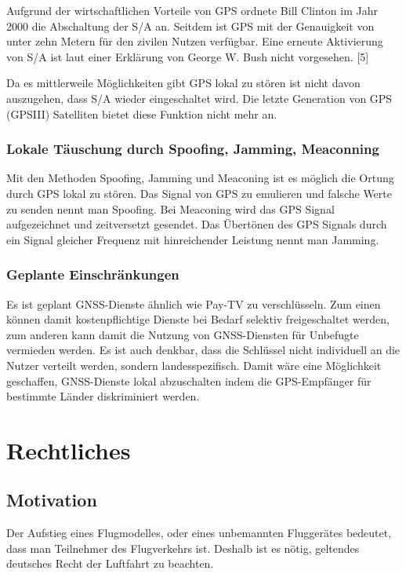 \documentclass[letterpaper,11pt,ngerman]{andi}
\begin{document}
Aufgrund der wirtschaftlichen Vorteile von GPS ordnete Bill Clinton im Jahr 2000 die Abschaltung der S/A an. Seitdem ist GPS mit der Genauigkeit von unter zehn Metern für den zivilen Nutzen verfügbar. Eine erneute Aktivierung von S/A ist laut einer Erklärung von George W. Bush nicht vorgesehen. {[}5{]}

Da es mittlerweile Möglichkeiten gibt GPS lokal zu stören ist nicht davon auszugehen, dass S/A wieder eingeschaltet wird. Die letzte Generation von GPS (GPSIII) Satelliten bietet diese Funktion nicht mehr an. \cite{sat_nav_dodel}


\subsection{Lokale Täuschung durch Spoofing, Jamming, Meaconning}
\label{included_projects/gps/GPS_SPEC/content:lokale-tauschung-durch-spoofing-jamming-meaconning}
Mit den Methoden Spoofing, Jamming und Meaconing ist es möglich die Ortung durch GPS lokal zu stören. Das Signal von GPS zu emulieren und falsche Werte zu senden nennt man Spoofing. Bei Meaconing wird das GPS Signal aufgezeichnet und zeitversetzt gesendet. Das Übertönen des GPS Signals durch ein Signal gleicher Frequenz mit hinreichender Leistung nennt man Jamming.


\subsection{Geplante Einschränkungen}
\label{included_projects/gps/GPS_SPEC/content:geplante-einschrankungen}
Es ist geplant GNSS-Dienste ähnlich wie Pay-TV zu verschlüsseln. Zum einen können damit kostenpflichtige Dienste bei Bedarf selektiv freigeschaltet werden, zum anderen kann damit die Nutzung von GNSS-Diensten für Unbefugte vermieden werden. Es ist auch denkbar, dass die Schlüssel nicht individuell an die Nutzer verteilt werden, sondern landesspezifisch. Damit wäre eine Möglichkeit geschaffen, GNSS-Dienste lokal abzuschalten indem die GPS-Empfänger für bestimmte Länder diskriminiert werden. \cite{sat_nav_dodel}


\chapter{Rechtliches}
\label{index:rechtliches}

\section{Motivation}
\label{included_projects/rechtliches/RECHTLICHES_SPEC/content:motivation}\label{included_projects/rechtliches/RECHTLICHES_SPEC/content::doc}
Der Aufstieg eines Flugmodelles, oder eines unbemannten Fluggerätes bedeutet, dass man Teilnehmer des Flugverkehrs ist. Deshalb ist es nötig, geltendes deutsches Recht der Luftfahrt zu beachten.
\end{document}
